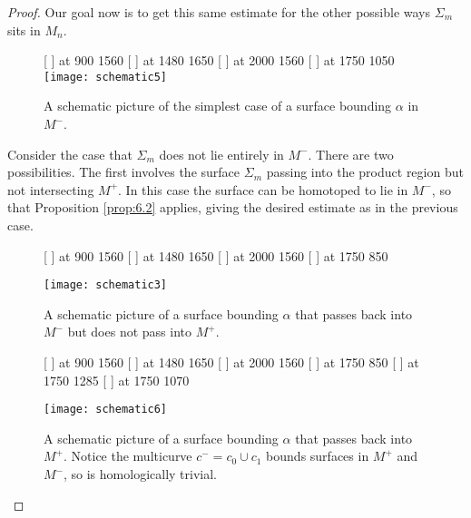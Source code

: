 \begin{proof}
Our goal now is to get this same estimate for the other possible ways $\Sigma_m$ sits in $M_n$.
\vspace{1cm}
\begin{figure}[H]
\small\hair 2pt
  [ ] at 900 1560
  [ ] at 1480 1650
  [ ] at 2000 1560
 \pinlabel {$\alpha$} [ ] at 1750 1050
\endlabellist
\centering
\texttt{[image: schematic5]}
\caption{ A schematic picture of the simplest case of a surface bounding $\alpha$ in $M^-$.}
\label{fig:alpha_bounds}
\end{figure}

Consider the case that $\Sigma_m$ does not lie entirely in $M^-$. There are two possibilities. The first involves the surface $\Sigma_m$ passing into the product region but not intersecting $M^+$. In this case the surface can be homotoped to lie in $M^-$, so that Proposition \ref{prop:6.2} applies, giving the desired estimate as in the previous case.
\vspace{2cm}
\begin{figure}[H]
\small\hair 2pt
  [ ] at 900 1560
  [ ] at 1480 1650
  [ ] at 2000 1560
 \pinlabel {$\alpha$} [ ] at 1750 850
\endlabellist
\centering

\texttt{[image: schematic3]}
\caption{ A schematic picture of a surface bounding $\alpha$ that passes back into $M^-$ but does not pass into $M^+$.}
\label{fig:pass_back_schematic}
\end{figure}

\vspace{2cm}
\begin{figure}[H]
\small\hair 2pt
  [ ] at 900 1560
  [ ] at 1480 1650
  [ ] at 2000 1560
 \pinlabel {$\alpha$} [ ] at 1750 850
  [ ] at 1750 1285
  [ ] at 1750 1070

\endlabellist
\centering

\texttt{[image: schematic6]}
\caption{ A schematic picture of a surface bounding $\alpha$ that passes back into $M^+$. Notice the multicurve $c^- = c_0\cup c_1$ bounds surfaces in $M^+$ and $M^-$, so is homologically trivial. }
\label{fig:bounds_both_sides}
\end{figure}




\end{proof}
